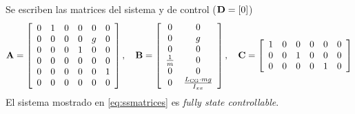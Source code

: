 Se escriben las matrices del sistema y de control ($\mathbf{D} = [0]$)
\begin{equation} \label{eq:ssmatrices}
	\mathbf{A} = 
	\left[\begin{array}{cccccc} 0 & 1 & 0 & 0 & 0 & 0\\ 0 & 0 & 0 & 0 & g & 0\\ 0 & 0 & 0 & 1 & 0 & 0\\ 0 & 0 & 0 & 0 & 0 & 0\\ 0 & 0 & 0 & 0 & 0 & 1\\ 0 & 0 & 0 & 0 & 0 & 0 \end{array}\right],\quad \mathbf{B} = 
	\left[\begin{array}{cc} 0 & 0\\ 0 & g\\ 0 & 0\\ \frac{1}{m} & 0\\ 0 & 0\\ 0 & \frac{L_{\mathrm{CG}} \cdot mg}{I_{xx}} \end{array}\right], \quad \mathbf{C} =  \left[\begin{array}{cccccc} 1 & 0 & 0 & 0 & 0 & 0\\ 0 & 0 & 1 & 0 & 0 & 0\\ 0 & 0 & 0 & 0 & 1 & 0 \end{array}\right]
\end{equation}
El sistema mostrado en \eqref{eq:ssmatrices} es \textit{fully state controllable}.